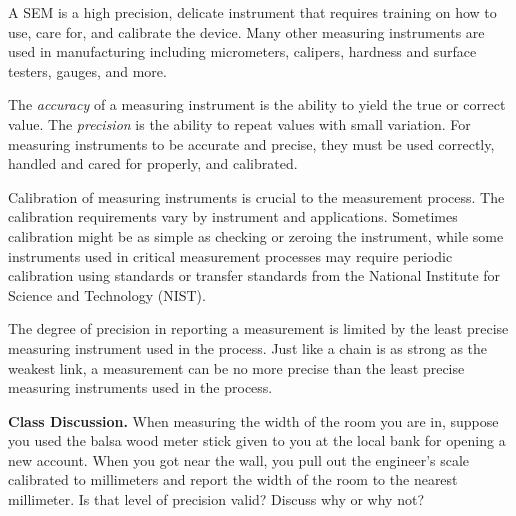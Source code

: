 \documentclass{ximera}
\begin{document}
\begin{center}
      \end{center}

A SEM is a high precision, delicate instrument that requires training on how to use, care for, and calibrate the device. Many other measuring instruments are used in manufacturing including micrometers, calipers, hardness and surface testers, gauges, and more. 

The \emph{accuracy} of a measuring instrument is the ability to yield the true or correct value.  The \emph{precision} is the ability to repeat values with small variation. For measuring instruments to be accurate and precise, they must be used correctly, handled and cared for properly, and calibrated. 

Calibration of measuring instruments is crucial to the measurement process. The calibration requirements vary by instrument and applications. Sometimes calibration might be as simple as checking or zeroing the instrument, while some instruments used in critical measurement processes may require periodic calibration using standards or transfer standards from the National Institute for Science and Technology (NIST).
    
The degree of precision in reporting a measurement is limited by the least precise measuring instrument used in the process.  Just like a chain is as strong as the weakest link, a measurement can be no more precise than the least precise measuring instruments used in the process. 

\begin{question}\label{q:lengthOfRoom}
\textbf{Class Discussion.} When measuring the width of the room you are in, suppose you used the balsa wood meter stick given to you at the local bank for opening a new account.  When you got near the wall, you pull out the engineer’s scale calibrated to millimeters and report the width of the room to the nearest millimeter.  Is that level of precision valid?  Discuss why or why not?   
\end{question}
\end{document}
